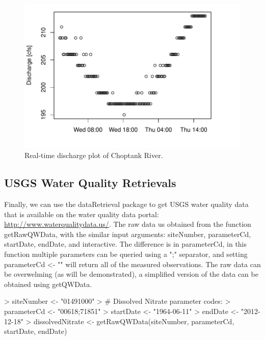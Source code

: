\documentclass[a4paper,11pt]{article}
\begin{document}
\begin{figure}
\begin{center}
\includegraphics{dataRetrieval-fig2}
\end{center}
\caption{Real-time discharge plot of Choptank River.}
\end{figure}


\subsection{USGS Water Quality Retrievals}
Finally, we can use the dataRetrieval package to get USGS water quality data that is available on the water quality data portal: \url{http://www.waterqualitydata.us/}. The raw data us obtained from the function  getRawQWData, with the similar input arguments: siteNumber, parameterCd, startDate, endDate, and interactive. The difference is in parameterCd, in this function multiple parameters can be queried using a ";" separator, and setting parameterCd <- "" will return all of the measured observations. The raw data can be overwelming (as will be demonstrated), a simplified version of the data can be obtained using getQWData.


\begin{Schunk}
\begin{Sinput}
> siteNumber <- "01491000" 
> # Dissolved Nitrate parameter codes:
> parameterCd <- "00618;71851"  
> startDate <- "1964-06-11"
> endDate <- "2012-12-18"
> dissolvedNitrate <- getRawQWData(siteNumber, parameterCd, 
       startDate, endDate)
\end{Sinput}
\end{Schunk}
\end{document}
